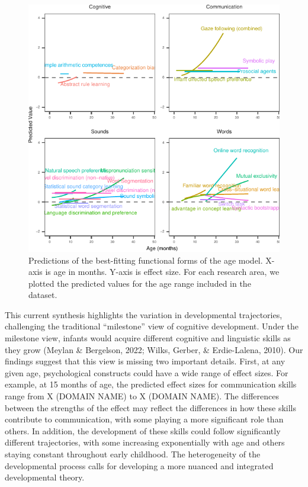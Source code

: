 \documentclass[10pt, letterpaper]{article}
\newenvironment{CodeChunk}{}{}
\begin{document}
\begin{CodeChunk}
\begin{figure}[h!]

{\centering \includegraphics{figs/2-col-imageb-1} 

}

\caption[Predictions of the best-fitting functional forms of the age model]{Predictions of the best-fitting functional forms of the age model. X-axis is age in months. Y-axis is effect size. For each research area, we plotted the predicted values for the age range included in the dataset.}\label{fig:2-col-imageb}
\end{figure}
\end{CodeChunk}

This current synthesis highlights the variation in developmental
trajectories, challenging the traditional ``milestone'' view of
cognitive development. Under the milestone view, infants would acquire
different cognitive and linguistic skills as they grow (Meylan \&
Bergelson, 2022; Wilks, Gerber, \& Erdie-Lalena, 2010). Our findings
suggest that this view is missing two important details. First, at any
given age, psychological constructs could have a wide range of effect
sizes. For example, at 15 months of age, the predicted effect sizes for
communication skills range from X (DOMAIN NAME) to X (DOMAIN NAME). The
differences between the strengths of the effect may reflect the
differences in how these skills contribute to communication, with some
playing a more significant role than others. In addition, the
development of these skills could follow significantly different
trajectories, with some increasing exponentially with age and others
staying constant throughout early childhood. The heterogeneity of the
developmental process calls for developing a more nuanced and integrated
developmental theory.
\end{document}
